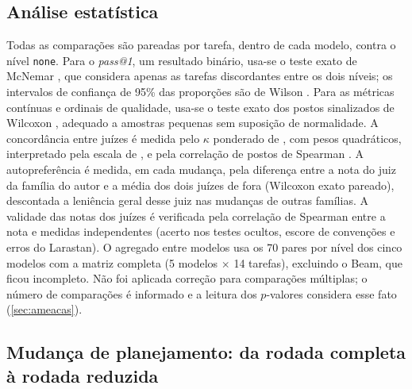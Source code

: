 \subsection{Análise estatística}
\label{sec:estatistica}

Todas as comparações são pareadas por tarefa, dentro de cada modelo, contra o
nível \texttt{none}. Para o \textit{pass@1}, um resultado binário, usa-se o teste
exato de McNemar \cite{mcnemar1947}, que considera apenas as tarefas
discordantes entre os dois níveis; os intervalos de confiança de 95\% das
proporções são de Wilson \cite{wilson1927}. Para as métricas contínuas e ordinais
de qualidade, usa-se o teste exato dos postos sinalizados de Wilcoxon
\cite{wilcoxon1945}, adequado a amostras pequenas sem suposição de normalidade.
A concordância entre juízes é medida pelo $\kappa$ ponderado de
, com pesos quadráticos, interpretado pela escala de
, e pela correlação de postos de Spearman
\cite{spearman1904}. A autopreferência é medida, em cada mudança, pela
diferença entre a nota do juiz da família do autor e a média dos dois juízes de
fora (Wilcoxon exato pareado), descontada a leniência geral desse juiz nas
mudanças de outras famílias. A validade das notas dos juízes é verificada pela
correlação de Spearman entre a nota e medidas independentes (acerto nos testes
ocultos, escore de convenções e erros do Larastan). O agregado entre modelos
usa os 70 pares por nível dos cinco modelos com a matriz completa (5 modelos
$\times$ 14 tarefas), excluindo o Beam, que ficou incompleto. Não foi aplicada
correção para comparações múltiplas; o número de comparações é informado e a
leitura dos $p$-valores considera esse fato (\autoref{sec:ameacas}).

\subsection{Mudança de planejamento: da rodada completa à rodada reduzida}
\label{sec:mudanca}

